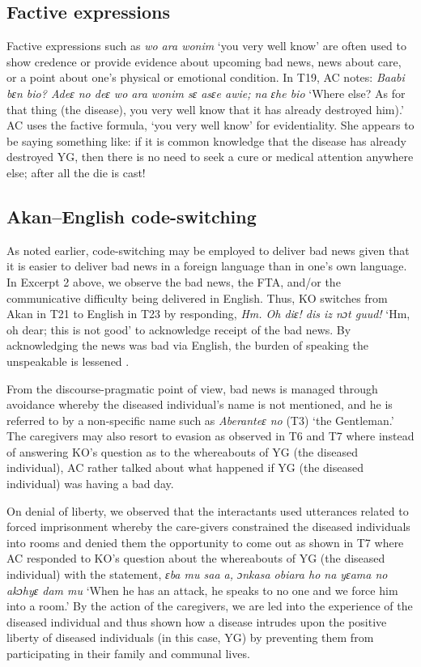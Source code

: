 \documentclass[output=paper,colorlinks,citecolor=brown]{langscibook}
\begin{document}
\subsection{Factive expressions}\label{sec:obeng:4.5}

Factive expressions such as \textit{wo ara wonim} ‘you very well know’ are often used to show credence or provide evidence about upcoming bad news, news about care, or a point about one’s physical or emotional condition. In T19, AC notes: \textit{Baabi bɛn bio? Adeɛ no deɛ wo ara wonim sɛ asɛe awie; na ɛhe bio} ‘Where else? As for that thing (the disease), you very well know that it has already destroyed him).’ AC uses the factive formula, ‘you very well know’ for evidentiality. She appears to be saying something like: if it is common knowledge that the disease has already destroyed YG, then there is no need to seek a cure or medical attention anywhere else; after all the die is cast! 

\subsection{Akan--English code-switching}\label{sec:obeng:4.6}

As noted earlier, code-switching may be employed to deliver bad news given that it is easier to deliver bad news in a foreign language than in one’s own language. In Excerpt 2 above, we observe the bad news, the FTA, and/or the communicative difficulty being delivered in English. Thus, KO switches from Akan in T21 to English in T23 by responding, \textit{Hm. Oh diɛ! dis iz nɔt guud!} ‘Hm, oh  dear; this is not good’ to acknowledge receipt of the bad news. By acknowledging the news was bad via English, the burden of speaking the unspeakable is lessened \citep{Movahedi1996}. 

From the discourse-pragmatic point of view, bad news is managed through avoidance whereby the diseased individual’s name is not mentioned, and he is referred to by a non-specific name such as \textit{Aberanteɛ no} (T3) ‘the Gentleman.’ The caregivers may also resort to evasion as observed in T6 and T7 where instead of answering KO’s question as to the whereabouts of YG (the diseased individual), AC rather talked about what happened if YG (the diseased individual) was having a bad day.

On denial of liberty, we observed that the interactants used utterances related to forced imprisonment whereby the care-givers constrained the diseased individuals into rooms and denied them the opportunity to come out as shown in T7 where AC responded to KO’s question about the whereabouts of YG (the diseased individual) with the statement, \textit{ɛba mu saa a, ɔnkasa obiara ho na yɛama no akɔhyɛ dam mu} ‘When he has an attack, he speaks to no one and we force him into a room.’ By the action of the caregivers, we are led into the experience of the diseased individual and thus shown how a disease intrudes upon the positive liberty of diseased individuals (in this case, YG) by preventing them from participating in their family and communal lives.
\end{document}
